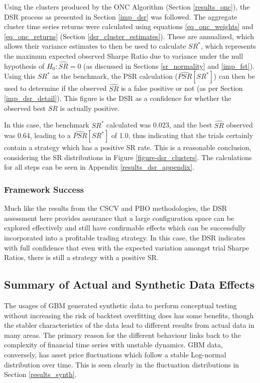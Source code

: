 \documentclass[a4paper,11pt,oneside]{article}
\theoremstyle{plain}
\theoremstyle{definition}
\begin{document}
	Using the clusters produced by the ONC Algorithm (Section \ref{results_onc}), the DSR process as presented in Section \ref{imp_dsr} was followed. The aggregate cluster time series returns were calculated using equations \ref{eq_onc_weights} and \ref{eq_onc_returns} (Section \ref{dsr_cluster_estimates}). These are annualized, which allows their variance estimates to then be used to calculate $SR^*$, which represents the maximum expected observed Sharpe Ratio due to variance under the null hypothesis of $H_0:  \widehat{SR} = 0$ (as discussed in Sections \ref{sr_normality} and \ref{imp_fst}). Using this $SR^*$ as the benchmark, the PSR calculation ($\widehat{PSR}[SR^*]$) can then be used to determine if the observed $\widehat{SR}$ is a false positive or not (as per Section \ref{imp_dsr_detail}). This figure is the DSR as a confidence for whether the observed best $SR$ is actually positive. \newline
	
	In this case, the benchmark $SR^*$ calculated was 0.023, and the best $\widehat{SR}$ observed was 0.64, leading to a $\widehat{PSR}[SR^*]$ of 1.0, thus indicating that the trials certainly contain a strategy which has a positive SR rate. This is a reasonable conclusion, considering the SR distributions in Figure \ref{figure-dsr_clusters}. The calculations for all steps can be seen in Appendix \ref{results_dsr_appendix}. \newline

	\subsubsection{Framework Success}
	
	Much like the results from the CSCV and PBO methodologies, the DSR assessment here provides assurance that a large configuration space can be explored effectively and still have confirmable effects which can be successfully incorporated into a profitable trading strategy. In this case, the DSR indicates with full confidence that even with the expected variation amongst trial Sharpe Ratios, there is still a strategy with a positive SR.

	
	\newpage
	\subsection{Summary of Actual and Synthetic Data Effects}\label{results_synth_summary}
	
		The usages of GBM generated synthetic data to perform conceptual testing without increasing the risk of backtest overfitting does has some benefits, though the stabler characteristics of the data lead to different results from actual data in many areas. The primary reason for the different behaviour links back to the complexity of financial time series with unstable dynamics. GBM data, conversely, has asset price fluctuations which follow a stable Log-normal distribution over time. This is seen clearly in the fluctuation distributions in Section \ref{results_synth}. \newline
		
\end{document}
